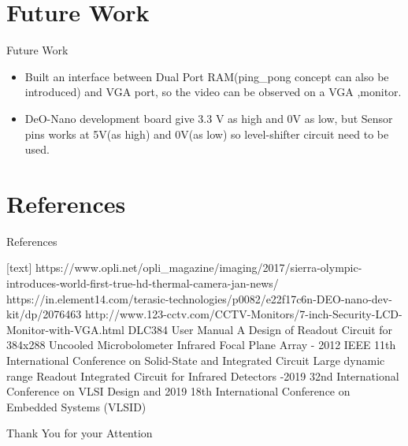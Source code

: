 \documentclass{beamer}
\begin{document}
\section{Future Work}
\begin{frame}{Future Work}
\begin{itemize}
    \item Built an interface between Dual Port RAM(ping\_pong concept can also be introduced) and VGA port, so the video can be observed on a VGA ,monitor.
    \item DeO-Nano development board give 3.3 V as high and 0V as low, but Sensor pins works at 5V(as high) and 0V(as low) so level-shifter circuit need to be used.
\end{itemize}
\end{frame}

\section{References}
\begin{frame}{References}
\begin{thebibliography}{}
[text]
 https://www.opli.net/opli\_magazine/imaging/2017/sierra-olympic-introduces-world-first-true-hd-thermal-camera-jan-news/
 https://in.element14.com/terasic-technologies/p0082/e22f17c6n-DEO-nano-dev-kit/dp/2076463
 http://www.123-cctv.com/CCTV-Monitors/7-inch-Security-LCD-Monitor-with-VGA.html
 DLC384 User Manual
 A Design of Readout Circuit for 384x288 Uncooled Microbolometer Infrared Focal Plane Array - 2012 IEEE 11th International Conference on Solid-State and Integrated Circuit
 Large dynamic range Readout Integrated Circuit for Infrared Detectors -2019 32nd International Conference on VLSI Design and 2019 18th International Conference on Embedded Systems (VLSID)
\end{thebibliography}
\end{frame}


\begin{frame}
\Huge{\centerline{Thank You for your Attention}}
\end{frame}
\end{document}
